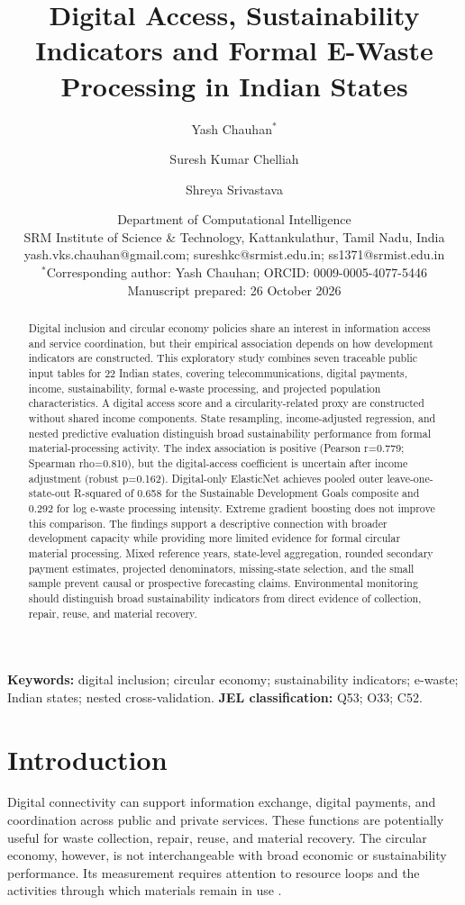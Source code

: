 \documentclass[11pt,a4paper]{article}
\title{Digital Access, Sustainability Indicators and Formal E-Waste Processing in Indian States}
\author{Yash Chauhan$^{*}$ \and Suresh Kumar Chelliah \and Shreya Srivastava}
\date{\small Department of Computational Intelligence\\
SRM Institute of Science \& Technology, Kattankulathur, Tamil Nadu, India\\[3pt]
\footnotesize yash.vks.chauhan@gmail.com; sureshkc@srmist.edu.in; ss1371@srmist.edu.in\\[3pt]
\footnotesize $^{*}$Corresponding author: Yash Chauhan; ORCID: 0009-0005-4077-5446\\[5pt]
\small Manuscript prepared: 26 October 2026}
\begin{document}
\maketitle
\begin{abstract}
Digital inclusion and circular economy policies share an interest in information access and service coordination, but their empirical association depends on how development indicators are constructed. This exploratory study combines seven traceable public input tables for 22 Indian states, covering telecommunications, digital payments, income, sustainability, formal e-waste processing, and projected population characteristics. A digital access score and a circularity-related proxy are constructed without shared income components. State resampling, income-adjusted regression, and nested predictive evaluation distinguish broad sustainability performance from formal material-processing activity. The index association is positive (Pearson r=0.779; Spearman rho=0.810), but the digital-access coefficient is uncertain after income adjustment (robust p=0.162). Digital-only ElasticNet achieves pooled outer leave-one-state-out R-squared of 0.658 for the Sustainable Development Goals composite and 0.292 for log e-waste processing intensity. Extreme gradient boosting does not improve this comparison. The findings support a descriptive connection with broader development capacity while providing more limited evidence for formal circular material processing. Mixed reference years, state-level aggregation, rounded secondary payment estimates, projected denominators, missing-state selection, and the small sample prevent causal or prospective forecasting claims. Environmental monitoring should distinguish broad sustainability indicators from direct evidence of collection, repair, reuse, and material recovery.
\end{abstract}
\textbf{Keywords:} digital inclusion; circular economy; sustainability indicators; e-waste; Indian states; nested cross-validation.
\textbf{JEL classification:} Q53; O33; C52.

\section{Introduction}
Digital connectivity can support information exchange, digital payments, and coordination across public and private services. These functions are potentially useful for waste collection, repair, reuse, and material recovery. The circular economy, however, is not interchangeable with broad economic or sustainability performance. Its measurement requires attention to resource loops and the activities through which materials remain in use \cite{geissdoerfer}.
\end{document}
